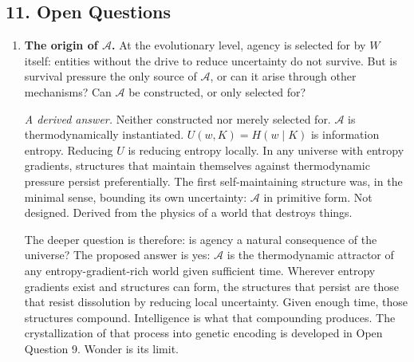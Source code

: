 \documentclass[
]{article}
\begin{document}
\subsection{11. Open Questions}\label{open-questions}

\begin{enumerate}
\def\labelenumi{\arabic{enumi}.}
\item
  \textbf{The origin of \(\mathcal{A}\).} At the evolutionary level,
  agency is selected for by \(W\) itself: entities without the drive to
  reduce uncertainty do not survive. But is survival pressure the only
  source of \(\mathcal{A}\), or can it arise through other mechanisms?
  Can \(\mathcal{A}\) be constructed, or only selected for?

  \emph{A derived answer.} Neither constructed nor merely selected for.
  \(\mathcal{A}\) is thermodynamically instantiated.
  \(U(w, K) = H(w \mid K)\) is information entropy. Reducing \(U\) is
  reducing entropy locally. In any universe with entropy gradients,
  structures that maintain themselves against thermodynamic pressure
  persist preferentially. The first self-maintaining structure was, in
  the minimal sense, bounding its own uncertainty: \(\mathcal{A}\) in
  primitive form. Not designed. Derived from the physics of a world that
  destroys things.

  The deeper question is therefore: is agency a natural consequence of
  the universe? The proposed answer is yes: \(\mathcal{A}\) is the
  thermodynamic attractor of any entropy-gradient-rich world given
  sufficient time. Wherever entropy gradients exist and structures can
  form, the structures that persist are those that resist dissolution by
  reducing local uncertainty. Given enough time, those structures
  compound. Intelligence is what that compounding produces. The
  crystallization of that process into genetic encoding is developed in
  Open Question 9. Wonder is its limit.


\end{enumerate}
\end{document}
